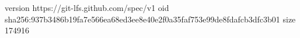 version https://git-lfs.github.com/spec/v1
oid sha256:937b3486b19fa7e566ea68ed3ee8e40e2f0a35faf753e99de8fdafcb3dfc3b01
size 174916

